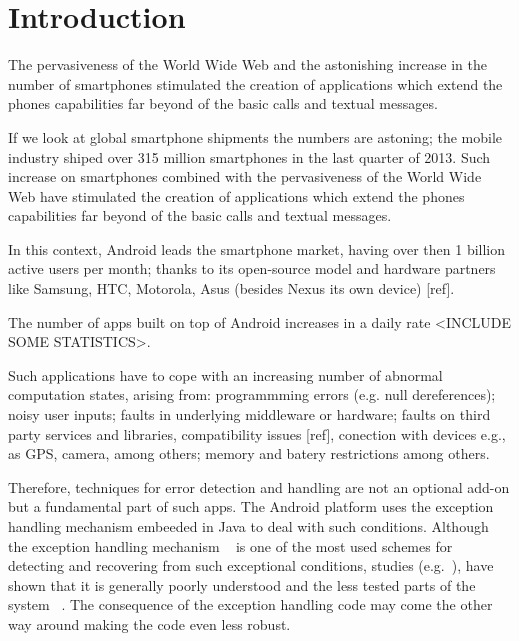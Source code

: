 \documentclass[conference]{IEEEtran}
\begin{document}

\section{Introduction}

The pervasiveness of the World Wide Web and the astonishing increase 
in the number of smartphones stimulated the creation of applications which extend the phones
 capabilities far beyond of the basic calls and textual messages. 

If we look at global smartphone shipments the numbers are astoning;
the mobile industry shiped over 315 million smartphones in the last quarter of 2013.
Such increase on smartphones combined with the pervasiveness of the World Wide Web
 have stimulated the creation of applications which extend the phones capabilities 
far beyond of the basic calls and textual messages. 

In this context, Android  leads the smartphone market, having over then 1 billion 
active users per month; thanks to its open-source model and hardware partners
 like Samsung, HTC, Motorola, Asus (besides Nexus its own device) [ref]. 

The number of apps built on top of Android increases in a daily rate <INCLUDE SOME STATISTICS>.




Such applications have to cope with an increasing number of abnormal
computation states, arising from: programmming errors (e.g. null dereferences);
 noisy user inputs; faults in underlying middleware or hardware; 
faults on third party services and libraries, compatibility issues [ref], 
conection with devices e.g., as GPS, camera, among others; memory and batery restrictions
among others.

Therefore, techniques for error detection and handling are not  an optional add-on but a 
fundamental part of such apps.
The Android platform uses the exception handling mechanism embeeded
 in Java to deal with such conditions. Although the exception handling mechanism
~\cite{goodenough1975exception} is one of the most used schemes for
detecting and recovering from such exceptional conditions, studies (e.g.~\cite{miller1997issues,Robil00,shah2010understanding, garcia2007extracting,garcia2001comparative,cabral2007exception,coelho2011unveiling}),
have shown that it is generally poorly understood and the less tested parts of the system ~\cite{coelho2011unveiling}.
The consequence of the exception handling code may come the other way around making the code even less robust.
\end{document}
